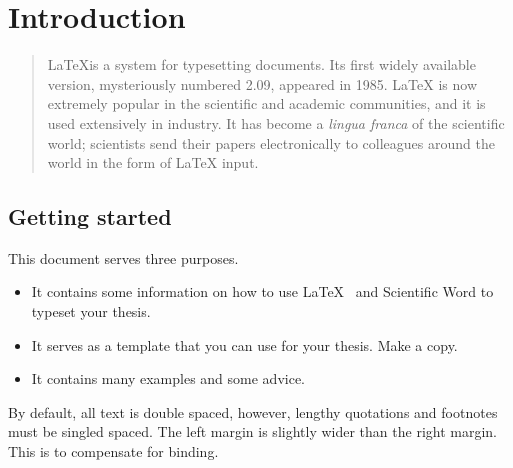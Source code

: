                       


\chapter{Introduction}

\label{chap:intro}

\begin{comment}
The two TeX boxes on the following line should only be used for the first
chapter
\end{comment}

%
\addtocounter{page}{-1}%

\begin{quotation}
\LaTeX is a system for typesetting documents. Its first widely available
version, mysteriously numbered 2.09, appeared in 1985. \LaTeX{} is now
extremely popular in the scientific and academic communities, and it is used
extensively in industry. It has become a \emph{lingua franca} of the
scientific world; scientists send their papers electronically to colleagues
around the world in the form of \LaTeX{} input.\cite{Lamport-1994}
\end{quotation}

\section{Getting started}

This document serves three purposes.

\begin{itemize}
\item It contains some information on how to use \LaTeX~\cite{Lamport-1994}
and Scientific Word to typeset your thesis.

\item It serves as a template that you can use for your thesis. Make a copy.

\item It contains many examples and some advice.
\end{itemize}

By default, all text is double spaced, however, lengthy quotations and
footnotes must be singled spaced. The left margin is slightly wider than the
right margin. This is to compensate for binding.


